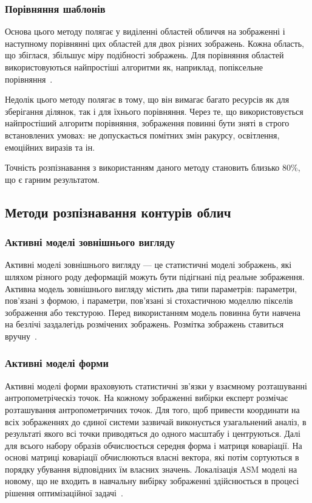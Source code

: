 \subsubsection{Порівняння шаблонів}
Основа цього методу полягає у виділенні областей обличчя на зображенні і наступному порівнянні цих областей для двох різних зображень.
Кожна область, що збіглася, збільшує міру подібності зображень. 
Для порівняння областей використовуються найпростіші алгоритми як, наприклад, попіксельне порівняння~\cite{PerveenN2013}.

Недолік цього методу полягає в тому, що він вимагає багато ресурсів як для зберігання ділянок, так і для їхнього порівняння. 
Через те, що використовується найпростіший алгоритм порівняння, зображення повинні бути зняті в строго встановлених умовах: не допускається помітних змін ракурсу, освітлення, емоційних виразів та ін.

Точність розпізнавання з використанням даного методу становить близько 80\%, що є гарним результатом.

\subsection{Методи розпізнавання контурів облич}
\subsubsection{Активні моделі зовнішнього вигляду}
Активні моделі зовнішнього вигляду --- це статистичні моделі зображень, які шляхом різного роду деформацій можуть бути підігнані під реальне зображення.
Активна модель зовнішнього вигляду містить два типи параметрів: параметри, пов'язані з формою, і параметри, пов'язані зі стохастичною моделлю пікселів зображення або текстурою.
Перед використанням модель повинна бути навчена на безлічі заздалегідь розмічених зображень. Розмітка зображень ставиться вручну~\cite{Rawlinson2010,Edwards1998}. 

\subsubsection{Активні моделі форми}
Активні моделі форми враховують статистичні зв'язки у взаємному розташуванні антропометріческіз точок.
На кожному зображенні вибірки експерт розмічає розташування антропометричних точок.
Для того, щоб привести координати на всіх зображеннях до єдиної системи зазвичай виконується узагальнений аналіз, в результаті якого всі точки приводяться до одного масштабу і центруються.
Далі для всього набору образів обчислюється середня форма і матриця коваріації.
На основі матриці коваріації обчислюються власні вектора, які потім сортуються в порядку убування відповідних їм власних значень.
Локалізація ASM моделі на новому, що не входить в навчальну вибірку зображенні здійснюється в процесі рішення оптимізаційної задачі~\cite{Choa}.    

